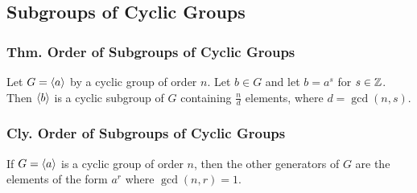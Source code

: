 \subsection{Subgroups of Cyclic Groups}

\subsubsection{Thm. Order of Subgroups of Cyclic Groups}
Let $G = \langle a \rangle$ by a cyclic group of order $n$. Let $b \in G$ and let $b = a^s$ for $s \in \mathbb{Z}$. Then $\langle b \rangle$ is a cyclic subgroup of $G$ containing $\frac{n}{d}$ elements, where $d = \gcd(n,s)$.

\subsubsection*{Cly. Order of Subgroups of Cyclic Groups}
If $G = \langle a \rangle$ is a cyclic group of order $n$, then the other generators of $G$ are the elements of the form $a^r$ where $\gcd(n,r) = 1$.